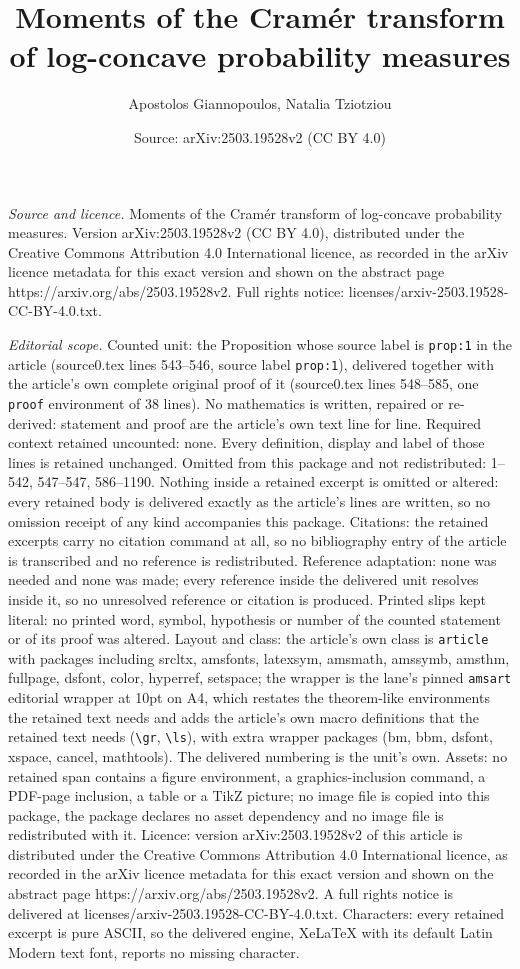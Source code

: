\documentclass[10pt,a4paper]{amsart}
\title[Moments of the Cram\'er transform of log-concave probability]{Moments of the Cram\'er transform of log-concave probability measures}
\author{Apostolos Giannopoulos, Natalia Tziotziou}
\date{Source: arXiv:2503.19528v2 (CC BY 4.0)}
\begin{document}
\maketitle

\noindent\emph{Source and licence.} Moments of the Cram\'er transform of log-concave probability measures. Version arXiv:2503.19528v2 (CC BY 4.0), distributed under the Creative Commons Attribution 4.0 International licence, as recorded in the arXiv licence metadata for this exact version and shown on the abstract page https://arxiv.org/abs/2503.19528v2. Full rights notice: licenses/arxiv-2503.19528-CC-BY-4.0.txt.\par\smallskip

\noindent\textit{Editorial scope.} Counted unit: the Proposition whose source label is \texttt{prop:1} in the article (source0.tex lines 543--546, source label \texttt{prop:1}), delivered together with the article's own complete original proof of it (source0.tex lines 548--585, one \texttt{proof} environment of 38 lines). No mathematics is written, repaired or re-derived: statement and proof are the article's own text line for line. Required context retained uncounted: none. Every definition, display and label of those lines is retained unchanged. Omitted from this package and not redistributed: 1--542, 547--547, 586--1190. Nothing inside a retained excerpt is omitted or altered: every retained body is delivered exactly as the article's lines are written, so no omission receipt of any kind accompanies this package. Citations: the retained excerpts carry no citation command at all, so no bibliography entry of the article is transcribed and no reference is redistributed. Reference adaptation: none was needed and none was made; every reference inside the delivered unit resolves inside it, so no unresolved reference or citation is produced. Printed slips kept literal: no printed word, symbol, hypothesis or number of the counted statement or of its proof was altered. Layout and class: the article's own class is \texttt{article} with packages including srcltx, amsfonts, latexsym, amsmath, amssymb, amsthm, fullpage, dsfont, color, hyperref, setspace; the wrapper is the lane's pinned \texttt{amsart} editorial wrapper at 10pt on A4, which restates the theorem-like environments the retained text needs and adds the article's own macro definitions that the retained text needs (\texttt{\textbackslash gr}, \texttt{\textbackslash ls}), with extra wrapper packages (bm, bbm, dsfont, xspace, cancel, mathtools). The delivered numbering is the unit's own. Assets: no retained span contains a figure environment, a graphics-inclusion command, a PDF-page inclusion, a table or a TikZ picture; no image file is copied into this package, the package declares no asset dependency and no image file is redistributed with it. Licence: version arXiv:2503.19528v2 of this article is distributed under the Creative Commons Attribution 4.0 International licence, as recorded in the arXiv licence metadata for this exact version and shown on the abstract page https://arxiv.org/abs/2503.19528v2. A full rights notice is delivered at licenses/arxiv-2503.19528-CC-BY-4.0.txt. Characters: every retained excerpt is pure ASCII, so the delivered engine, XeLaTeX with its default Latin Modern text font, reports no missing character.
\end{document}
